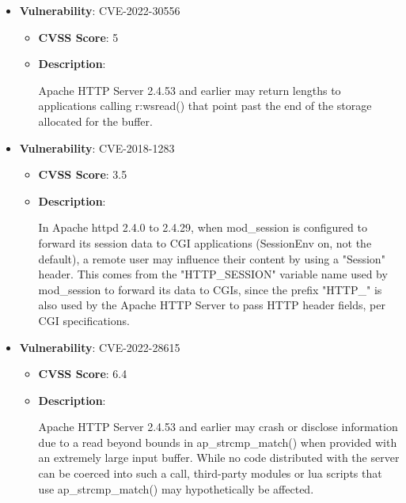 \documentclass{article}
\begin{document}
\begin{itemize}
        \item \textbf{Vulnerability}: CVE-2022-30556
        \begin{itemize}
            \item \textbf{CVSS Score}:  5 
            \item \textbf{Description}:
            \parbox[t]{0.9\linewidth}{
                \ttfamily Apache HTTP Server 2.4.53 and earlier may return lengths to applications calling r:wsread() that point past the end of the storage allocated for the buffer.
            }
        \end{itemize}
    
        \item \textbf{Vulnerability}: CVE-2018-1283
        \begin{itemize}
            \item \textbf{CVSS Score}:  3.5 
            \item \textbf{Description}:
            \parbox[t]{0.9\linewidth}{
                \ttfamily In Apache httpd 2.4.0 to 2.4.29, when mod\_session is configured to forward its session data to CGI applications (SessionEnv on, not the default), a remote user may influence their content by using a "Session" header. This comes from the "HTTP\_SESSION" variable name used by mod\_session to forward its data to CGIs, since the prefix "HTTP\_" is also used by the Apache HTTP Server to pass HTTP header fields, per CGI specifications.
            }
        \end{itemize}
    
        \item \textbf{Vulnerability}: CVE-2022-28615
        \begin{itemize}
            \item \textbf{CVSS Score}:  6.4 
            \item \textbf{Description}:
            \parbox[t]{0.9\linewidth}{
                \ttfamily Apache HTTP Server 2.4.53 and earlier may crash or disclose information due to a read beyond bounds in ap\_strcmp\_match() when provided with an extremely large input buffer. While no code distributed with the server can be coerced into such a call, third-party modules or lua scripts that use ap\_strcmp\_match() may hypothetically be affected.
            }
        \end{itemize}
    

\end{itemize}
\end{document}
